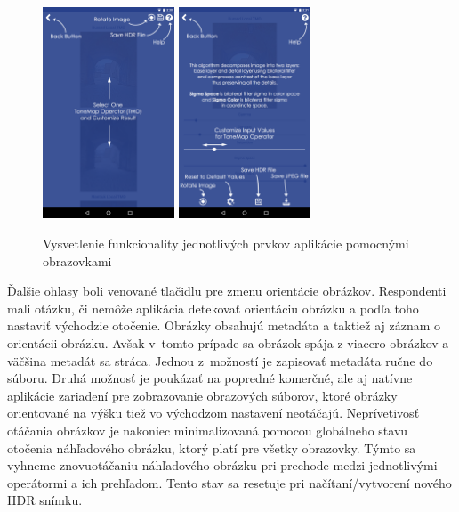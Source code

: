 \begin{figure}[ht!]
  \centering
  \includegraphics[width=0.35\textwidth]{figures/ui/hints/tmos}
	\includegraphics[width=0.35\textwidth]{figures/ui/hints/tmo}
  \caption{Vysvetlenie funkcionality jednotlivých prvkov aplikácie pomocnými obrazovkami}
  \label{fig:HintScreens}
\end{figure}

Ďalšie ohlasy boli venované tlačidlu pre zmenu orientácie obrázkov. Respondenti mali otázku, či nemôže aplikácia detekovať orientáciu
obrázku a podľa toho nastaviť východzie otočenie. Obrázky obsahujú metadáta a taktiež aj záznam o orientácii obrázku. Avšak v~tomto
prípade sa obrázok spája z viacero obrázkov a väčšina metadát sa stráca. Jednou z~možností je zapisovať metadáta ručne do súboru.
Druhá možnosť je poukázať na popredné komerčné, ale aj natívne aplikácie zariadení pre zobrazovanie obrazových súborov, ktoré obrázky
orientované na výšku tiež vo východzom nastavení neotáčajú. Neprívetivosť otáčania obrázkov je nakoniec minimalizovaná pomocou globálneho
stavu otočenia náhľadového obrázku, ktorý platí pre všetky obrazovky. Týmto sa vyhneme znovuotáčaniu náhľadového obrázku pri prechode
medzi jednotlivými operátormi a ich prehľadom. Tento stav sa resetuje pri načítaní/vytvorení nového HDR snímku.
